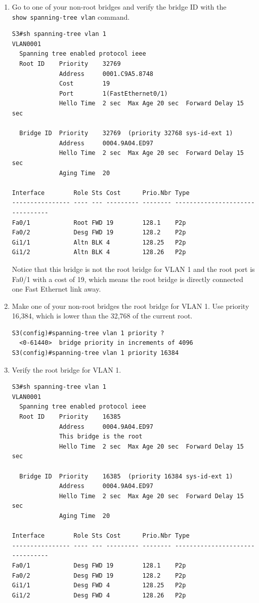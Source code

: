 \documentclass[b5paper,11pt]{memoir}
\begin{document}
\begin{enumerate}
\item
  Go to one of your
  non-root bridges and verify the bridge ID with the
  \texttt{show\ spanning-tree\ vlan} command.

\begin{verbatim}
S3#sh spanning-tree vlan 1
VLAN0001
  Spanning tree enabled protocol ieee
  Root ID    Priority    32769
             Address     0001.C9A5.8748
             Cost        19
             Port        1(FastEthernet0/1)
             Hello Time  2 sec  Max Age 20 sec  Forward Delay 15 sec
 
  Bridge ID  Priority    32769  (priority 32768 sys-id-ext 1)
             Address     0004.9A04.ED97
             Hello Time  2 sec  Max Age 20 sec  Forward Delay 15 sec
             Aging Time  20
 
Interface        Role Sts Cost      Prio.Nbr Type
---------------- ---- --- --------- -------- --------------------------------
Fa0/1            Root FWD 19        128.1    P2p
Fa0/2            Desg FWD 19        128.2    P2p
Gi1/1            Altn BLK 4         128.25   P2p
Gi1/2            Altn BLK 4         128.26   P2p
\end{verbatim}

  Notice that this bridge is not the root bridge for VLAN 1 and the root
  port is Fa0/1 with a cost of 19, which means the root bridge is
  directly connected one Fast Ethernet link away.
\item
  Make one of your non-root bridges the root bridge for VLAN 1. Use
  priority 16,384, which is lower than the 32,768 of the current root.

\begin{verbatim}
S3(config)#spanning-tree vlan 1 priority ?
  <0-61440>  bridge priority in increments of 4096
S3(config)#spanning-tree vlan 1 priority 16384
\end{verbatim}
\item
  Verify the root bridge for VLAN 1.

\begin{verbatim}
S3#sh spanning-tree vlan 1
VLAN0001
  Spanning tree enabled protocol ieee
  Root ID    Priority    16385
             Address     0004.9A04.ED97
             This bridge is the root
             Hello Time  2 sec  Max Age 20 sec  Forward Delay 15 sec
 
  Bridge ID  Priority    16385  (priority 16384 sys-id-ext 1)
             Address     0004.9A04.ED97
             Hello Time  2 sec  Max Age 20 sec  Forward Delay 15 sec
             Aging Time  20
 
Interface        Role Sts Cost      Prio.Nbr Type
---------------- ---- --- --------- -------- --------------------------------
Fa0/1            Desg FWD 19        128.1    P2p
Fa0/2            Desg FWD 19        128.2    P2p
Gi1/1            Desg FWD 4         128.25   P2p
Gi1/2            Desg FWD 4         128.26   P2p
\end{verbatim}
\end{enumerate}
\end{document}
